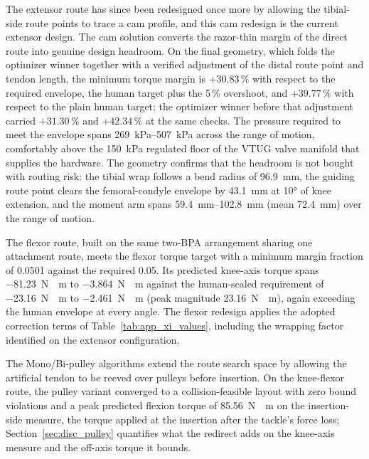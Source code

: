 The extensor route has since been redesigned once more by allowing the tibial-side route points to trace a cam profile, and this cam redesign is the current extensor design. The cam solution converts the razor-thin margin of the direct route into genuine design headroom. On the final geometry, which folds the optimizer winner together with a verified adjustment of the distal route point and tendon length, the minimum torque margin is $+30.83\,\%$ with respect to the required envelope, the human target plus the 5\,\% overshoot, and $+39.77\,\%$ with respect to the plain human target; the optimizer winner before that adjustment carried $+31.30$\,\% and $+42.34$\,\% at the same checks. The pressure required to meet the envelope spans \SIrange[range-phrase=--]{269}{507}{\kPa} across the range of motion, comfortably above the \qty{150}{\kPa} regulated floor of the VTUG valve manifold that supplies the hardware. The geometry confirms that the headroom is not bought with routing risk: the tibial wrap follows a bend radius of \qty{96.9}{\mm}, the guiding route point clears the femoral-condyle envelope by \qty{43.1}{\mm} at \ang{10} of knee extension, and the moment arm spans \SIrange[range-phrase=--]{59.4}{102.8}{\mm} (mean \qty{72.4}{\mm}) over the range of motion.

The flexor route, built on the same two-BPA arrangement sharing one attachment route, meets the flexor torque target with a minimum margin fraction of 0.0501 against the required 0.05. Its predicted knee-axis torque spans \qty{-81.23}{\newton\cdot\meter} to \qty{-3.864}{\newton\cdot\meter} against the human-scaled requirement of \qty{-23.16}{\newton\cdot\meter} to \qty{-2.461}{\newton\cdot\meter} (peak magnitude \qty{23.16}{\newton\cdot\meter}), again exceeding the human envelope at every angle. The flexor redesign applies the adopted correction terms of Table~\ref{tab:app_xi_values}, including the wrapping factor identified on the extensor configuration.

The Mono/Bi-pulley algorithms extend the route search space by allowing the artificial tendon to be reeved over pulleys before insertion. On the knee-flexor route, the pulley variant converged to a collision-feasible layout with zero bound violations and a peak predicted flexion torque of \qty{85.56}{\newton\cdot\meter} on the insertion-side measure, the torque applied at the insertion after the tackle's force loss; Section~\ref{sec:disc_pulley} quantifies what the redirect adds on the knee-axis measure and the off-axis torque it bounds.

